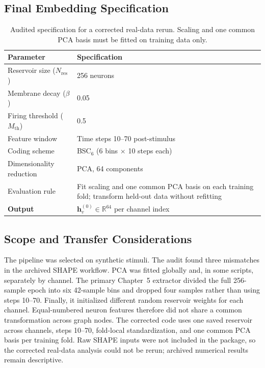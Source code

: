 \subsection{Final Embedding Specification}

\begin{table}[H]
    \centering
    \caption{Audited specification for a corrected real-data rerun. Scaling and one common PCA basis must be fitted on training data only.}
    \label{tab:final_embedding_spec}
    \renewcommand{\arraystretch}{1.2}
    \begin{tabular}{|l|p{8cm}|}
        \hline
        \textbf{Parameter} & \textbf{Specification} \\
        \hline
        Reservoir size ($N_{\text{res}}$) & 256 neurons \\
        Membrane decay ($\beta$) & 0.05 \\
        Firing threshold ($M_{\text{th}}$) & 0.5 \\
        Feature window & Time steps 10--70 post-stimulus \\
        Coding scheme & BSC$_6$ (6 bins $\times$ 10 steps each) \\
        Dimensionality reduction & PCA, 64 components \\
        Evaluation rule & Fit scaling and one common PCA basis on each training fold; transform held-out data without refitting \\
        \textbf{Output} & $\mathbf{h}_v^{(0)} \in \mathbb{R}^{64}$ per channel index \\
        \hline
    \end{tabular}
\end{table}

\subsection{Scope and Transfer Considerations}

The pipeline was selected on synthetic stimuli. The audit found three mismatches in the archived SHAPE workflow. PCA was fitted globally and, in some scripts, separately by channel. The primary Chapter~5 extractor divided the full 256-sample epoch into six 42-sample bins and dropped four samples rather than using steps 10--70. Finally, it initialized different random reservoir weights for each channel. Equal-numbered neuron features therefore did not share a common transformation across graph nodes. The corrected code uses one saved reservoir across channels, steps 10--70, fold-local standardization, and one common PCA basis per training fold. Raw SHAPE inputs were not included in the package, so the corrected real-data analysis could not be rerun; archived numerical results remain descriptive.

